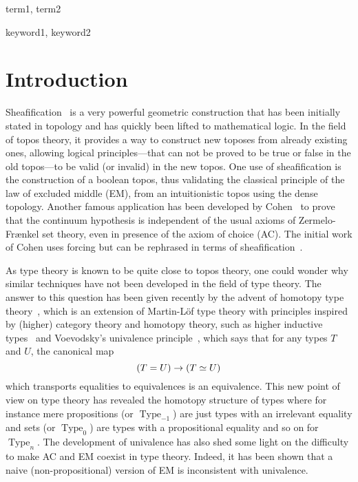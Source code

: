 \documentclass[preprint,9pt,numbers]{sigplanconf}
\DeclareMathOperator{\Type}{Type}
\newenvironment{mymath}[1][-0em]{%
  \newcommand\mymathaux{\vspace{#1}}%
  \vspace{#1}%
  \begin{equation*}%
  }{ %
    \mymathaux%
  \end{equation*}}
\begin{document}
\terms
term1, term2

\keywords
keyword1, keyword2

\section{Introduction}
\label{sec:intro}

Sheafification~\cite{maclanemoerdijk} is a very powerful geometric
construction that has been initially stated in topology and has
quickly been lifted to mathematical logic.
%
In the field of topos theory, it provides a way to construct new toposes
from already existing ones, allowing logical principles---that can not
be proved to be true or false in the old topos---to be valid (or
invalid) in the new topos.
%
One use of sheafification is the construction of a boolean
topos, thus validating the classical principle of the law of excluded
middle (EM), from an intuitionistic topos using the dense topology. 
%
Another famous application has been developed by
Cohen~\cite{cohen1966} to prove that the continuum hypothesis is
independent of the usual axioms of Zermelo-Fr\ae nkel set theory, even
in presence of the axiom of choice (AC). The initial work of Cohen
uses forcing but can be rephrased in terms of
sheafification~\cite{maclanemoerdijk}.

As type theory is known to be quite close to topos theory,
one could wonder why similar techniques have not been developed in the
field of type theory. 
%
The answer to this question has been given recently by the advent of
homotopy type theory~\cite{hottbook}, which is an extension of
Martin-Löf type theory with principles inspired by (higher) category
theory and homotopy theory, such as higher inductive
types~\cite{lumsdaine2011higher,lumsdaine2013higher} and
Voevodsky's univalence principle~\cite{kapulkin2012simplicial}, which
says that for any types $T$ and $U$, the canonical map 
\begin{mymath}
(T = U) \to (T \simeq U)
\end{mymath}%
%
which transports equalities to equivalences is an equivalence.
%
This new point of view on type theory has revealed the homotopy
structure of types where for instance mere propositions (or
$\Type_{-1}$) are just types with an
irrelevant equality and sets (or $\Type_{0}$) are types
with a propositional equality and so on for $\Type_{n}$.
%
The development of univalence has also shed some light on the
difficulty to make AC and EM coexist in type theory. Indeed, it
has been shown that a naive (non-propositional) version of EM is
inconsistent with univalence.
\end{document}
